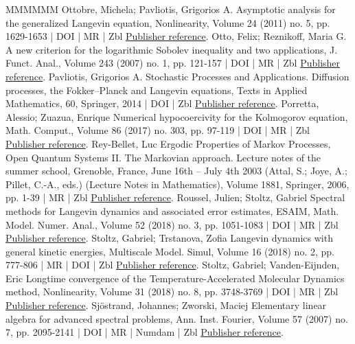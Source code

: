 \documentclass[10pt,a4paper]{article}
\numberwithin{equation}{section}
\begin{document}
\begin{thebibliography}{MMMMMM}
 Ottobre, Michela; Pavliotis, Grigorios A. Asymptotic analysis for the generalized Langevin equation, Nonlinearity, Volume 24 (2011) no. 5, pp. 1629-1653 | DOI | MR | Zbl \href{https://ahl.centre-mersenne.org/item/AHL_2022__5__523_0/#OP11}{Publisher reference}.
 Otto, Felix; Reznikoff, Maria G. A new criterion for the logarithmic Sobolev inequality and two applications, J. Funct. Anal., Volume 243 (2007) no. 1, pp. 121-157 | DOI | MR | Zbl \href{https://ahl.centre-mersenne.org/item/AHL_2022__5__523_0/#otto2007}{Publisher reference}.
 Pavliotis, Grigorios A. Stochastic Processes and Applications. Diffusion processes, the Fokker–Planck and Langevin equations, Texts in Applied Mathematics, 60, Springer, 2014 | DOI | Zbl \href{https://ahl.centre-mersenne.org/item/AHL_2022__5__523_0/#PavliotisBook}{Publisher reference}.
 Porretta, Alessio; Zuazua, Enrique Numerical hypocoercivity for the Kolmogorov equation, Math. Comput., Volume 86 (2017) no. 303, pp. 97-119 | DOI | MR | Zbl \href{https://ahl.centre-mersenne.org/item/AHL_2022__5__523_0/#PZ17}{Publisher reference}.
 Rey-Bellet, Luc Ergodic Properties of Markov Processes, Open Quantum Systems II. The Markovian approach. Lecture notes of the summer school, Grenoble, France, June 16th – July 4th 2003 (Attal, S.; Joye, A.; Pillet, C.-A., eds.) (Lecture Notes in Mathematics), Volume 1881, Springer, 2006, pp. 1-39 | MR | Zbl \href{https://ahl.centre-mersenne.org/item/AHL_2022__5__523_0/#rey-bellet}{Publisher reference}.
 Roussel, Julien; Stoltz, Gabriel Spectral methods for Langevin dynamics and associated error estimates, ESAIM, Math. Model. Numer. Anal., Volume 52 (2018) no. 3, pp. 1051-1083 | DOI | MR | Zbl \href{https://ahl.centre-mersenne.org/item/AHL_2022__5__523_0/#RS18}{Publisher reference}.
 Stoltz, Gabriel; Trstanova, Zofia Langevin dynamics with general kinetic energies, Multiscale Model. Simul, Volume 16 (2018) no. 2, pp. 777-806 | MR | DOI | Zbl \href{https://ahl.centre-mersenne.org/item/AHL_2022__5__523_0/#ST18}{Publisher reference}.
 Stoltz, Gabriel; Vanden-Eijnden, Eric Longtime convergence of the Temperature-Accelerated Molecular Dynamics method, Nonlinearity, Volume 31 (2018) no. 8, pp. 3748-3769 | DOI | MR | Zbl \href{https://ahl.centre-mersenne.org/item/AHL_2022__5__523_0/#SV18}{Publisher reference}.
 Sjöstrand, Johannes; Zworski, Maciej Elementary linear algebra for advanced spectral problems, Ann. Inst. Fourier, Volume 57 (2007) no. 7, pp. 2095-2141 | DOI | MR | Numdam | Zbl \href{https://ahl.centre-mersenne.org/item/AHL_2022__5__523_0/#SZ07}{Publisher reference}.

\end{thebibliography}
\end{document}
